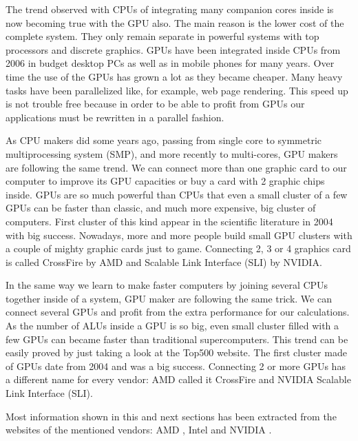 \documentclass{article}
\begin{document}
The trend observed with CPUs of integrating many companion cores
inside is now becoming true with the GPU also. The main reason is the
lower cost of the complete system. They only remain separate in
powerful systems with top processors and discrete graphics. %
GPUs have
been integrated inside CPUs from 2006 in budget desktop PCs
as well as in mobile phones for many years. Over time the use of the GPUs
has grown a lot as they became cheaper. Many heavy tasks
have been parallelized like, for example, web page
rendering. %
This
speed up is not trouble free because in order to be able to profit from GPUs
our applications must be rewritten in a parallel fashion. %

As CPU makers did some years ago, passing from single core to symmetric multiprocessing system (SMP), and more recently to multi-cores, GPU makers are following the same trend. We can connect more than one graphic card to our computer to improve its GPU capacities or buy a card with 2 graphic chips inside. GPUs are so much powerful than CPUs that even a small cluster of a few GPUs can be faster than classic, and much more expensive, big cluster of computers. First cluster of this kind appear in the scientific literature in 2004 \cite{10.1109/SC.2004.26} with big success. Nowadays, more and more people build small GPU clusters with a couple of mighty graphic cards just to game. Connecting 2, 3 or 4 graphics card is called CrossFire by AMD and Scalable Link Interface (SLI) by NVIDIA.

In the same way we learn to make faster computers by joining several CPUs together inside of a system, GPU maker are following the same trick. We can connect several GPUs and profit from the extra performance for our calculations. As the number of ALUs inside a GPU is so big, even small cluster filled with a few GPUs can became faster than traditional supercomputers. This trend can be easily proved by just taking a look at the Top500 website. The first cluster made of GPUs date from 2004 \cite{10.1109/SC.2004.26} and was a big success. Connecting 2 or more GPUs has a different name for every vendor: AMD called it CrossFire and NVIDIA Scalable Link Interface (SLI).

Most information shown in this and next sections has been extracted from the websites of the mentioned vendors: AMD \cite{amd}, Intel \cite{intel} and NVIDIA \cite{nvidia}.
\end{document}
